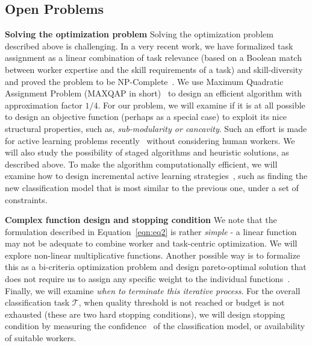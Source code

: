\subsection{Open Problems}\label{opp}
\vspace{-0.1in}
{\bf  Solving the optimization problem} Solving the optimization problem described above is challenging. In a very recent work, we have formalized  task assignment as a linear combination of task relevance (based on a Boolean match between worker expertise and the skill requirements of a task) and skill-diversity~\cite{edbt172} and proved the problem to be NP-Complete~\cite{feo1990class,feo1992one}. We use Maximum Quadratic Assignment Problem (MAXQAP in short)~\cite{arkin2001approximating} to design an efficient algorithm with approximation factor $1/4$. For our problem, we will examine if it is at all possible to design an objective function (perhaps as a special case) to exploit its nice structural properties, such as, {\em sub-modularity or cancavity}. Such an effort is made for active learning problems recently~\cite{hoi2006batch} without considering human workers. We will also study the possibility of staged algorithms and heuristic solutions, as described above. To make the algorithm computationally efficient, we will examine how to design incremental active learning strategies~\cite{qi2009two}, such as finding the new classification model that is most similar to the previous one, under a set of constraints. 


{\bf Complex function design and stopping condition} We note that the formulation described in Equation~\ref{eqn:eq2} is rather {\em simple} - a linear function may not be adequate to combine worker and task-centric optimization. We will explore non-linear multiplicative functions. Another possible way is to formalize this as a bi-criteria optimization problem and design pareto-optimal solution that does not require us to assign any specific weight to the individual functions~\cite{bilo2004pareto,anagnostopoulos2012online,asudeh2014crowdsourcing}.  Finally, we  will examine {\em when to terminate this iterative process}. For the overall classification task $\mathcal{T}$, when quality threshold is not reached or budget is not exhausted (these are two hard stopping conditions), we will design stopping condition by measuring the  confidence~\cite{vlachos2008stopping} of the classification model, or availability of suitable workers.


